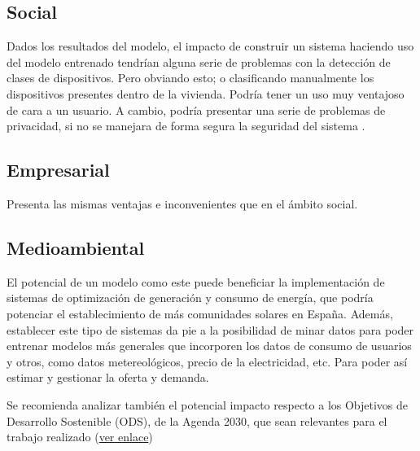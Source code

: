 \subsection{Social}
Dados los resultados del modelo, el impacto de construir un sistema haciendo uso del modelo entrenado tendrían alguna serie de problemas con la detección de clases de dispositivos. Pero obviando esto; o clasificando manualmente los dispositivos presentes dentro de la vivienda. Podría tener un uso muy ventajoso de cara a un usuario. 
A cambio, podría presentar una serie de problemas de privacidad, si no se manejara de forma segura la seguridad del sistema \autocite{osti_2229911}.
\subsection{Empresarial}
Presenta las mismas ventajas e inconvenientes que en el ámbito social. 
\autocite{osti_1373019}

\subsection{Medioambiental}
El potencial de un modelo como este puede beneficiar la implementación de sistemas de optimización de generación y consumo de energía, que podría potenciar el establecimiento de más comunidades solares en España. Además, establecer este tipo de sistemas da pie a la posibilidad de minar datos para poder entrenar modelos más generales que incorporen los datos de consumo de usuarios y otros, como datos metereológicos, precio de la electricidad, etc. Para poder así estimar y gestionar la oferta y demanda. 

Se recomienda analizar también el potencial impacto respecto a los Objetivos de Desarrollo Sostenible (ODS), de la Agenda 2030, que sean relevantes para el trabajo realizado (\href{https://www.un.org/sustainabledevelopment/es/objetivos-de-desarrollo-sostenible/}{ver enlace})

